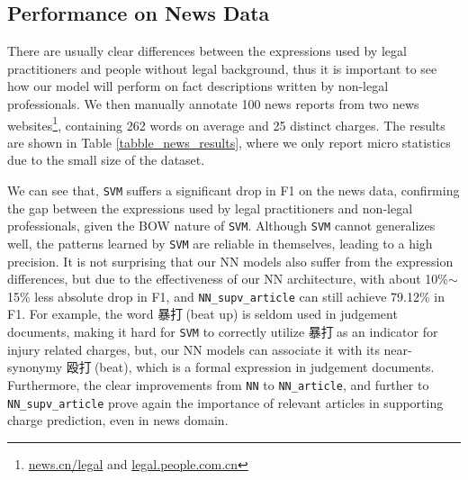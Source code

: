 \subsection{Performance on News Data}
There are usually 
clear %
differences between the expressions used by legal practitioners and people without legal background, 
thus it is important to see how our model will perform on fact descriptions written by non-legal professionals.
%
We then manually annotate 100 news reports %
from two news websites\footnote{\url{news.cn/legal} and \url{legal.people.com.cn}},
containing 262 words on average and 25 distinct charges.
%
The results are shown in Table \ref{tabble_news_results}, where we only report micro statistics due to the small size of the dataset.


We can see that, \texttt{SVM} suffers a significant drop in F1 on the news data, %
confirming the gap between the expressions used by legal practitioners and non-legal professionals,
given the BOW nature of \texttt{SVM}.
Although \texttt{SVM} cannot generalizes well, the patterns learned by \texttt{SVM} are reliable in themselves, leading to a high precision.
It is not surprising that our NN models also suffer from the expression differences, %
but due to the effectiveness of our NN architecture, with about 10\%$\sim$15\% less absolute drop in F1, and \texttt{NN\_supv\_article} can still achieve 79.12\% in F1. %
For example, the word 暴打$\ $(beat up) is seldom used in judgement documents,
making it hard for \texttt{SVM} to correctly utilize  暴打$\ $as an indicator for injury related charges, but, %
our NN models can associate it with its  near-synonymy  殴打$\ $(beat), which is a formal expression in judgement documents.
Furthermore, the clear improvements from \texttt{NN} to \texttt{NN\_article}, and further to \texttt{NN\_supv\_article} prove again the importance of relevant articles 
in supporting charge prediction, even in news domain.

